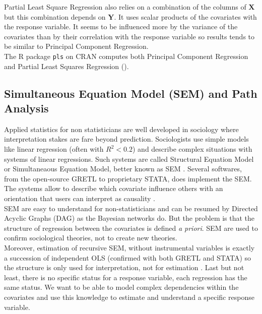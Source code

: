 \documentclass[12pt,a4paper]{report}
\begin{document}
	Partial Least Square Regression \cite{abdi2003partial,geladi1986partial} also relies on a combination of the columns of  $\boldsymbol{X}$ but this combination depends on $\boldsymbol{Y}$.
		It uses scalar products of the covariates with the response variable.	
	It seems to be influenced more by the variance of the covariates than by their correlation with the response variable so results tends to be similar to Principal Component Regression.
	\\
	
	The R package {\tt pls} on CRAN computes both Principal Component Regression and Partial Least Squares Regression (\cite{packagepls}).
		\subsection{Simultaneous Equation Model (SEM) and Path Analysis}		%
		Applied statistics  for non statisticians are well developed in sociology where interpretation  stakes are fare beyond prediction. Sociologists use simple models like linear regression (often with $R^2<0.2$) and describe complex situations with systems of linear regressions. Such systems are called Structural Equation Model or Simultaneaous Equation Model, better known as SEM \cite{davidson1993estimation}. Several softwares, from the open-source GRETL \cite{CottrellLucchetti2007gretlmanual} to proprietary STATA, does implement the SEM. The systems allow to describe which covariate influence others with an orientation that users can interpret as causality \cite{pearl2000causality,pearl1998graphs}. \\
		
		SEM are easy to understand for non-statisticians and can be resumed by Directed Acyclic Graphs (DAG) as the Bayesian networks do. But the problem is that the structure of regression between the covariates is defined {\it a priori}. SEM are used to confirm sociological theories, not to create new theories. \\
		
		Moreover, estimation of recursive SEM, without instrumental variables is exactly a succession of independent OLS (confirmed with both GRETL and STATA) so the structure is only used for interpretation, not for estimation \cite{brito2006graphical}. Last but not least, there is no specific status for a response variable, each regression has the same status. We want to be able to model complex dependencies within the covariates and use this knowledge to estimate and understand a specific response variable.
\end{document}
